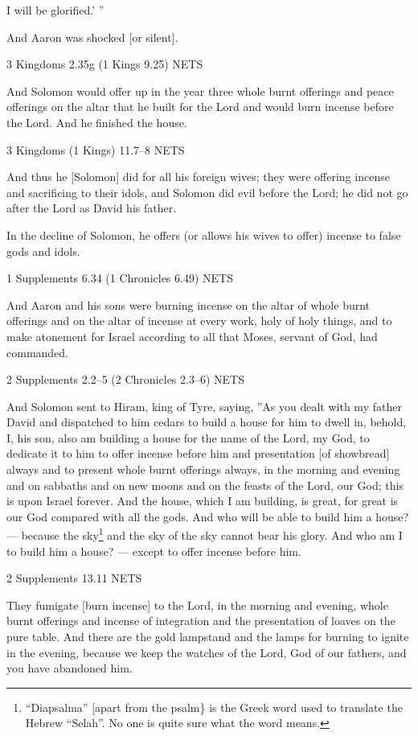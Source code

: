 \documentclass[
]{article}
\newcommand{\RL}[1]{\beginR #1\endR}
\begin{document}
I will be glorified.\RL{' ''}

And Aaron was shocked {[}or silent{]}.

3 Kingdoms 2.35g (1 Kings 9.25) NETS

And Solomon would offer up in the year three whole burnt offerings and
peace offerings on the altar that he built for the Lord and would burn
incense before the Lord. And he finished the house.

3 Kingdoms (1 Kings) 11.7--8 NETS

And thus he {[}Solomon{]} did for all his foreign wives; they were
offering incense and sacrificing to their idols, and Solomon did evil
before the Lord; he did not go after the Lord as David his father.

In the decline of Solomon, he offers (or allows his wives to offer)
incense to false gods and idols.

1 Supplements 6.34 (1 Chronicles 6.49) NETS

And Aaron and his sons were burning incense on the altar of whole burnt
offerings and on the altar of incense at every work, holy of holy
things, and to make atonement for Israel according to all that Moses,
servant of God, had commanded.

2 Supplements 2.2--5 (2 Chronicles 2.3--6) NETS

And Solomon sent to Hiram, king of Tyre, saying, \RL{''}As you dealt
with my father David and dispatched to him cedars to build a house for
him to dwell in, behold, I, his son, also am building a house for the
name of the Lord, my God, to dedicate it to him to offer incense before
him and presentation {[}of showbread{]} always and to present whole
burnt offerings always, in the morning and evening and on sabbaths and
on new moons and on the feasts of the Lord, our God; this is upon Israel
forever. And the house, which I am building, is great, for great is our
God compared with all the gods. And who will be able to build him a
house? --- because the sky\footnote{``Diapsalma'' {[}apart from the
  psalm\} is the Greek word used to translate the Hebrew ``Selah''. No
  one is quite sure what the word means.} and the sky of the sky cannot
bear his glory. And who am I to build him a house? --- except to offer
incense before him.

2 Supplements 13.11 NETS

They fumigate {[}burn incense{]} to the Lord, in the morning and
evening, whole burnt offerings and incense of integration and the
presentation of loaves on the pure table. And there are the gold
lampstand and the lamps for burning to ignite in the evening, because we
keep the watches of the Lord, God of our fathers, and you have abandoned
him.
\end{document}
